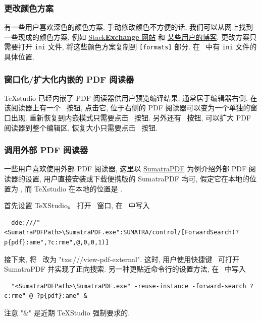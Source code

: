 \subsubsection{更改颜色方案}

有一些用户喜欢深色的颜色方案.
手动修改颜色不方便的话, 我们可以从网上找到一些现成的颜色方案,
例如
\href{https://tex.stackexchange.com/questions/108315/how-can-i-set-a-dark-theme-in-texstudio}{\textsf{Stack\textbf{Exchange}} 网站}%
和%
\href{https://robjhyndman.com/hyndsight/dark-themes-for-writing/}{某些用户的博客}.
更改方案只需要打开 \texttt{ini} 文件,
将这些颜色方案复制到 \texttt{[formats]} 部分.
在\ 
中有 \texttt{ini} 文件的具体位置.

\subsubsection{窗口化/扩大化内嵌的 PDF 阅读器}

\TeX studio 已经内嵌了 PDF 阅读器供用户预览编译结果,
通常居于编辑器右侧.
在该阅读器上有一个\  按钮,
点击它,
位于右侧的 PDF 阅读器可以变为一个单独的窗口出现.
重新恢复到内嵌模式只需要点击\  按钮.
另外还有\  按钮,
可以扩大 PDF 阅读器到整个编辑区,
恢复大小只需要点击\  按钮.

\subsubsection{调用外部 PDF 阅读器}

一些用户喜欢使用外部 PDF 阅读器,
这里以 \href{https://www.sumatrapdfreader.org/free-pdf-reader}{SumatraPDF} 为例介绍外部 PDF 阅读器的设置,
用户直接安装或下载便携版的 SumatraPDF 均可,
假定它在本地的位置为 ,
而 \TeX studio 在本地的位置是 .

首先设置 \TeX Studio。
打开\  窗口,
在\  中写入
\begin{lstlisting}
  dde:///"<SumatraPDFPath>\SumatraPDF.exe":SUMATRA/control/[ForwardSearch(?p{pdf}:ame",?c:rme",@,0,0,1)]
\end{lstlisting}
接下来, 将\  改为
"txs:///view-pdf-external".
这时,
用户使用快捷键\  可打开 SumatraPDF 并实现了正向搜索.
另一种更贴近命令行的设置方法,
在\  中写入
\begin{lstlisting}
  "<SumatraPDFPath>\SumatraPDF.exe" -reuse-instance -forward-search ?c:rme" @ ?p{pdf}:ame" &
\end{lstlisting}
注意 "&" 是近期 \TeX Studio 强制要求的.

